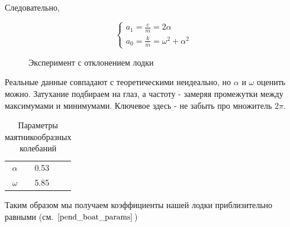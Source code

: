 \documentclass[12pt,a4paper]{article}
\begin{document}
Следовательно, 

\begin{equation*}
	\begin{cases}
		a_1 = \frac{c}{m} = 2\alpha
		\\
		a_0 = \frac{k}{m} = \omega^2 + \alpha^2
	\end{cases}
\end{equation*}

\begin{figure}[h]
	\caption{Эксперимент с отклонением лодки}
\end{figure}

Реальные данные совпадают с теоретическими неидеально, но $\alpha$ и $\omega$ оценить можно. Затухание подбираем на глаз, а частоту - замеряя промежутки между максимумами и минимумами. Ключевое здесь - не забыть про множитель $2\pi$.

\begin{table}[h]
	\caption{Параметры маятникообразных колебаний}
	\label{boat_pend_params}
	\begin{center}
		\begin{tabular}{ccc}
			$\alpha$ &  0.53 \\
			$\omega$ &  5.85 \\
		\end{tabular}
	\end{center}
\end{table}

Таким образом мы получаем коэффициенты нашей лодки приблизительно равными  (см. $\ref{pend_boat_params}$)
\end{document}
